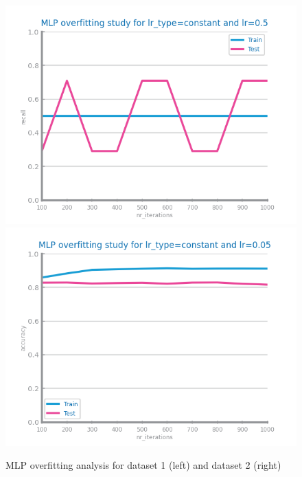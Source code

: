 \documentclass[10pt]{extarticle}
\begin{document}
\begin{figure}[H]
\centering\includegraphics[scale=0.7]{images/dataset1/models_evaluation/CovidPos_mlp_recall_overfitting.png}
\includegraphics[scale=0.7]{images/dataset2/models_evaluation/Credit_Score_mlp_accuracy_overfitting.png}
\caption{MLP overfitting analysis for dataset 1 (left) and dataset 2 (right)}
\end{figure}
\end{document}
